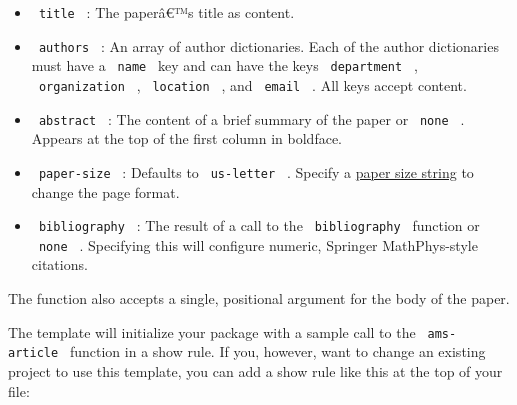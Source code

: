 \begin{itemize}
\tightlist
\item
  \texttt{\ title\ } : The paperâ€™s title as content.
\item
  \texttt{\ authors\ } : An array of author dictionaries. Each of the
  author dictionaries must have a \texttt{\ name\ } key and can have the
  keys \texttt{\ department\ } , \texttt{\ organization\ } ,
  \texttt{\ location\ } , and \texttt{\ email\ } . All keys accept
  content.
\item
  \texttt{\ abstract\ } : The content of a brief summary of the paper or
  \texttt{\ none\ } . Appears at the top of the first column in
  boldface.
\item
  \texttt{\ paper-size\ } : Defaults to \texttt{\ us-letter\ } . Specify
  a
  \href{https://typst.app/docs/reference/layout/page/\#parameters-paper}{paper
  size string} to change the page format.
\item
  \texttt{\ bibliography\ } : The result of a call to the
  \texttt{\ bibliography\ } function or \texttt{\ none\ } . Specifying
  this will configure numeric, Springer MathPhys-style citations.
\end{itemize}

The function also accepts a single, positional argument for the body of
the paper.

The template will initialize your package with a sample call to the
\texttt{\ ams-article\ } function in a show rule. If you, however, want
to change an existing project to use this template, you can add a show
rule like this at the top of your file:

\begin{Shaded}
\begin{Highlighting}[]

\NormalTok{    (}
\NormalTok{    ),}
\NormalTok{  ),}
\NormalTok{)}

\end{Highlighting}
\end{Shaded}

